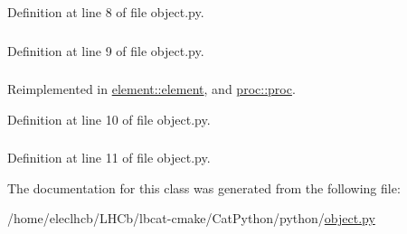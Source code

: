 Definition at line 8 of file object.py.\hypertarget{classobject_1_1object_a15f13858ecdbf661a97a7da93d717922}{
\subsubsection[{obj}]{}}
\label{classobject_1_1object_a15f13858ecdbf661a97a7da93d717922}


Definition at line 9 of file object.py.\hypertarget{classobject_1_1object_add82cb657066d4ab5b39035792971503}{
\subsubsection[{panel}]{}}
\label{classobject_1_1object_add82cb657066d4ab5b39035792971503}


Reimplemented in \hyperlink{classelement_1_1element_abadf93bb1b1fa6f5fdd00dde996d0f2c}{element::element}, and \hyperlink{classproc_1_1proc_a9ee372f307278c50a935b46ca00a350a}{proc::proc}.

Definition at line 10 of file object.py.\hypertarget{classobject_1_1object_a6b4e1fd053496eafff2bc0f8aed7f089}{
\subsubsection[{path}]{}}
\label{classobject_1_1object_a6b4e1fd053496eafff2bc0f8aed7f089}


Definition at line 11 of file object.py.

The documentation for this class was generated from the following file:\begin{DoxyCompactItemize}
\item 
/home/eleclhcb/LHCb/lbcat-\/cmake/CatPython/python/\hyperlink{object_8py}{object.py}\end{DoxyCompactItemize}
